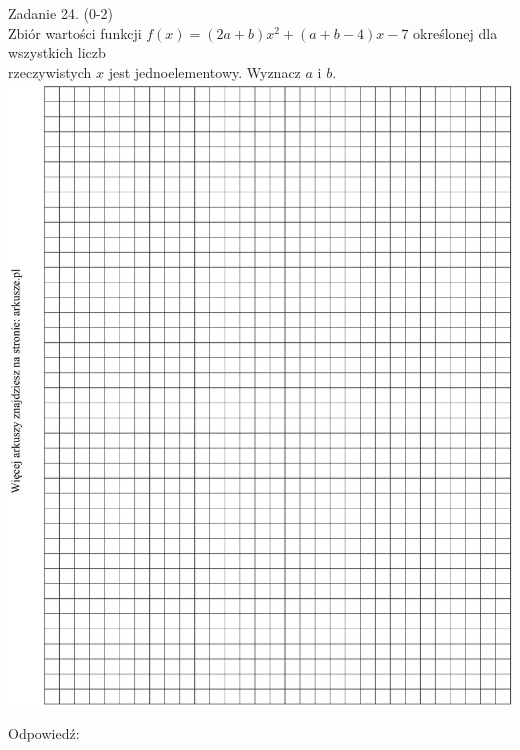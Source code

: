 \documentclass[10pt]{article}
\begin{document}
Zadanie 24. (0-2)\\
Zbiór wartości funkcji \(f(x)=(2 a+b) x^{2}+(a+b-4) x-7\) określonej dla wszystkich liczb\\
rzeczywistych \(x\) jest jednoelementowy. Wyznacz \(a\) i \(b\).\\
\includegraphics[max width=\textwidth, center]{2024_11_21_dd21f7544b65bcf1b3c7g-10}

Odpowiedź:
\end{document}
